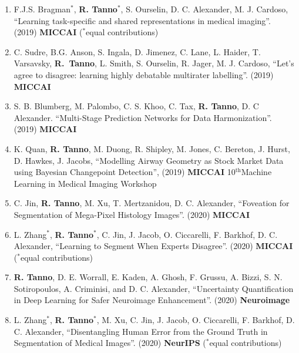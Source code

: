 \begin{enumerate}
	\item F.J.S. Bragman$^*$, \textbf{R. Tanno}$^*$, S. Ourselin, D. C. Alexander, M. J. Cardoso, ``Learning task-specific and shared representations in medical imaging''.  (2019) \textbf{MICCAI} ($^*$equal contributions)
	
	\item C. Sudre, B.G. Anson, S. Ingala, D. Jimenez, C. Lane, L. Haider, T. Varsavsky,  \textbf{R.~Tanno}, L. Smith, S. Ourselin, R. Jager, M. J. Cardoso, ``Let's agree to disagree: learning highly debatable multirater labelling''.  (2019) \textbf{MICCAI} 
	
	\item S. B. Blumberg, M. Palombo, C. S. Khoo, C. Tax, \textbf{R. Tanno}, D. C Alexander. “Multi-Stage Prediction Networks for Data Harmonization”. (2019) \textbf{MICCAI }
	
	\item K. Quan, \textbf{R. Tanno}, M. Duong, R. Shipley, M. Jones, C. Bereton, J. Hurst, D. Hawkes, J. Jacobs, 	``Modelling Airway Geometry as Stock Market Data using Bayesian Changepoint Detection'', (2019) \textbf{MICCAI} 10$^{\text{th}}$Machine Learning in Medical Imaging Workshop

\item C. Jin, \textbf{R. Tanno}, M. Xu, T. Mertzanidou, D. C. Alexander, ``Foveation for Segmentation of Mega-Pixel Histology Images''.  (2020) \textbf{MICCAI} 

\item L. Zhang$^*$, \textbf{R. Tanno}$^*$,  C. Jin, J. Jacob, O. Ciccarelli, F. Barkhof, D. C. Alexander, ``Learning to Segment When Experts Disagree''.  (2020) \textbf{MICCAI} ($^*$equal contributions)

\item \textbf{R. Tanno}, D. E. Worrall, E. Kaden, A. Ghosh, F. Grussu, A. Bizzi, S. N. Sotiropoulos, A. Criminisi, and D. C. Alexander, ``Uncertainty Quantification in Deep Learning for Safer Neuroimage Enhancement''. (2020) \textbf{Neuroimage} 

\item L. Zhang$^*$, \textbf{R. Tanno}$^*$, M. Xu, C. Jin, J. Jacob, O. Ciccarelli, F. Barkhof, D. C. Alexander, ``Disentangling Human Error from the Ground Truth in Segmentation of Medical Images''.  (2020) \textbf{NeurIPS} ($^*$equal contributions)





\end{enumerate}

